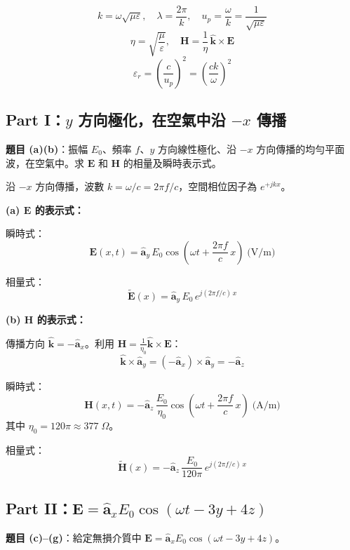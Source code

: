 \documentclass[12pt,a4paper]{article}
\newcommand{\vE}{\mathbf{E}}
\newcommand{\vH}{\mathbf{H}}
\newcommand{\vk}{\mathbf{k}}
\newcommand{\ax}{\hat{\mathbf{a}}_x}
\newcommand{\ay}{\hat{\mathbf{a}}_y}
\newcommand{\az}{\hat{\mathbf{a}}_z}
\begin{document}
\begin{formulabox}[相關公式]
\[
  k = \omega\sqrt{\mu\varepsilon}, \quad \lambda = \frac{2\pi}{k}, \quad u_p = \frac{\omega}{k} = \frac{1}{\sqrt{\mu\varepsilon}}
\]
\[
  \eta = \sqrt{\frac{\mu}{\varepsilon}}, \quad \vH = \frac{1}{\eta}\,\hat{\vk} \times \vE
\]
\[
  \varepsilon_r = \left(\frac{c}{u_p}\right)^2 = \left(\frac{ck}{\omega}\right)^2
\]
\end{formulabox}

\subsection*{Part I：$y$ 方向極化，在空氣中沿 $-x$ 傳播}

\textbf{題目 (a)(b)}：振幅 $E_0$、頻率 $f$、$y$ 方向線性極化、沿 $-x$ 方向傳播的均勻平面波，在空氣中。求 $\vE$ 和 $\vH$ 的相量及瞬時表示式。

\begin{solutionbox}[詳解]

沿 $-x$ 方向傳播，波數 $k = \omega/c = 2\pi f/c$，空間相位因子為 $e^{+jkx}$。

\textbf{(a) $\vE$ 的表示式：}

瞬時式：
\[
  \boxed{\vE(x,t) = \ay\, E_0 \cos\!\left(\omega t + \frac{2\pi f}{c}\,x\right) \;\text{(V/m)}}
\]

相量式：
\[
  \boxed{\tilde{\vE}(x) = \ay\, E_0\, e^{j(2\pi f/c)\,x}}
\]

\textbf{(b) $\vH$ 的表示式：}

傳播方向 $\hat{\vk} = -\ax$。利用 $\vH = \frac{1}{\eta_0}\hat{\vk} \times \vE$：
\[
  \hat{\vk} \times \ay = (-\ax) \times \ay = -\az
\]

瞬時式：
\[
  \boxed{\vH(x,t) = -\az\,\frac{E_0}{\eta_0}\cos\!\left(\omega t + \frac{2\pi f}{c}\,x\right) \;\text{(A/m)}}
\]
其中 $\eta_0 = 120\pi \approx 377\;\Omega$。

相量式：
\[
  \boxed{\tilde{\vH}(x) = -\az\,\frac{E_0}{120\pi}\, e^{j(2\pi f/c)\,x}}
\]
\end{solutionbox}

\subsection*{Part II：$\vE = \ax E_0 \cos(\omega t - 3y + 4z)$}

\textbf{題目 (c)--(g)}：給定無損介質中 $\vE = \ax E_0 \cos(\omega t - 3y + 4z)$。
\end{document}

